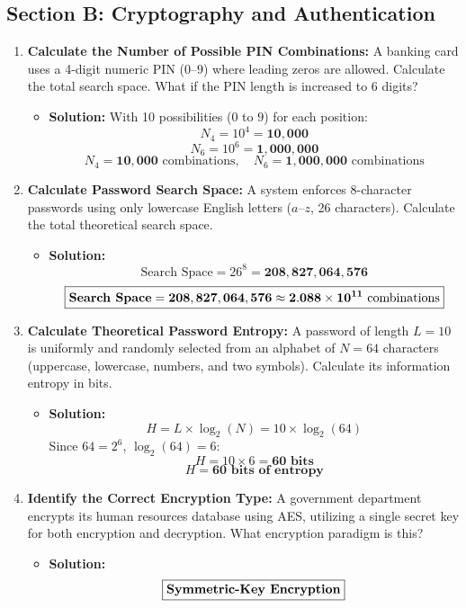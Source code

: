 \subsection{Section B: Cryptography and Authentication}

\begin{enumerate}[label=\textbf{Problem \arabic*.,resume},leftmargin=1.5cm]
\item \textbf{Calculate the Number of Possible PIN Combinations:}
A banking card uses a 4-digit numeric PIN ($0$--$9$) where leading zeros are allowed. Calculate the total search space. What if the PIN length is increased to 6 digits?
\begin{itemize}
\item \textbf{Solution:} With 10 possibilities ($0$ to $9$) for each position:
\[ N_4 = 10^4 = \mathbf{10,000} \]
\[ N_6 = 10^6 = \mathbf{1,000,000} \]
\[ \boxed{N_4 = \mathbf{10,000} \text{ combinations}, \quad N_6 = \mathbf{1,000,000} \text{ combinations}} \]
\end{itemize}

\item \textbf{Calculate Password Search Space:}
A system enforces 8-character passwords using only lowercase English letters ($a$--$z$, 26 characters). Calculate the total theoretical search space.
\begin{itemize}
\item \textbf{Solution:}
\[ \text{Search Space} = 26^8 = \mathbf{208,827,064,576} \]
\[ \boxed{\text{\textbf{Search Space}} = \mathbf{208,827,064,576} \approx \mathbf{2.088 \times 10^{11}} \text{ combinations}} \]
\end{itemize}

\item \textbf{Calculate Theoretical Password Entropy:}
A password of length $L = 10$ is uniformly and randomly selected from an alphabet of $N = 64$ characters (uppercase, lowercase, numbers, and two symbols). Calculate its information entropy in bits.
\begin{itemize}
\item \textbf{Solution:}
\[ H = L \times \log_2(N) = 10 \times \log_2(64) \]
Since $64 = 2^6$, $\log_2(64) = 6$:
\[ H = 10 \times 6 = \mathbf{60\text{ bits}} \]
\[ \boxed{H = \mathbf{60\text{ bits of entropy}}} \]
\end{itemize}

\item \textbf{Identify the Correct Encryption Type:}
A government department encrypts its human resources database using AES, utilizing a single secret key for both encryption and decryption. What encryption paradigm is this?
\begin{itemize}
\item \textbf{Solution:}
\[ \boxed{\text{\textbf{Symmetric-Key Encryption}}} \]
\end{itemize}


\end{enumerate}
